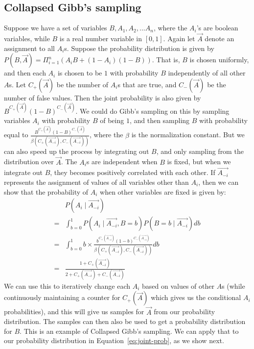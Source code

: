 \documentclass{sig-alternate}
\newcounter{prob}
\begin{document}
\subsection{Collapsed Gibb's sampling}
Suppose we have a set of variables $B, A_1, A_2, ... A_n$, where the $A_i$'s are boolean variables, while $B$ is a real number variable in $[0,1]$. Again let $\overrightarrow{A}$ denote an assignment to all $A_i$s. Suppose the probability distribution is given by $P(B, \overrightarrow{A}) = \Pi_{i=1}^{n} (A_iB + (1-A_i)(1-B))$. That is, $B$ is chosen uniformly, and then each $A_i$ is chosen to be $1$ with probability $B$ independently of all other $A$s. Let $C_{+}(\overrightarrow{A})$ be the number of $A_i$s that are true, and $C_{-}(\overrightarrow{A})$ be the number of false values. Then the joint probability is also given by $B^{C_{+}(\overrightarrow{A})}(1-B)^{C_{-}(\overrightarrow{A})}$. We could do Gibb's sampling on this by sampling variables $A_i$ with probability $B$ of being $1$, and then sampling $B$ with probability equal to $\frac{B^{C_{+}(\overrightarrow{A})}(1-B)^{C_{-}(\overrightarrow{A})}}{\beta(C_{+}(\overrightarrow{A_{-i}}), C_{-}(\overrightarrow{A_{-i}}))}$, where the $\beta$ is the normalization constant. But we can also speed up the process by integrating out $B$, and only sampling from the distribution over $\overrightarrow{A}$. The $A_i$s are independent when $B$ is fixed, but when we integrate out $B$, they becomes positively correlated with each other. If $\overrightarrow{A_{-i}}$ represents the assignment of values of all variables other than $A_i$, then we can show that the probability of $A_i$ when other variables are fixed is given by:
\begin{align*}
&P(A_i \mid \overrightarrow{A_{-i}})\\
= &\int_{b=0}^{1} P(A_i \mid \overrightarrow{A_{-i}}, B=b) P(B=b \mid \overrightarrow{A_{-i}}) db\\
= &\int_{b=0}^{1} b \times \frac{b^{C_{+}(\overrightarrow{A_{-i}})}(1-b)^{C_{-}(\overrightarrow{A_{-i}})}}{\beta(C_{+}(\overrightarrow{A_{-i}}), C_{-}(\overrightarrow{A_{-i}}))} db\\
= &\frac{1 + C_{+}(\overrightarrow{A_{-i}})}{2 +  C_{+}(\overrightarrow{A_{-i}}) +  C_{-}(\overrightarrow{A_{-i}})}
\end{align*}
We can use this to iteratively change each $A_i$ based on values of other $A$s (while continuously maintaining a counter for $C_{+}(\overrightarrow{A})$ which gives us the conditional $A_i$ probabilities), and this will give us samples for $\overrightarrow{A}$ from our probability distribution. The samples can then also be used to get a probability distribution for $B$. This is an example of Collapsed Gibb's sampling. We can apply that to our probability distribution in Equation~\ref{eq:joint-prob}, as we show next.
\end{document}
